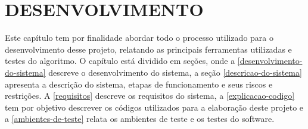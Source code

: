 \chapter{\textbf{DESENVOLVIMENTO}}

Este capítulo tem por finalidade abordar todo o processo utilizado para o desenvolvimento desse projeto, relatando as principais ferramentas utilizadas e testes do algoritmo. O capítulo está dividido em seções, onde a \autoref{desenvolvimento-do-sistema} descreve o desenvolvimento do sistema, a seção \autoref{descricao-do-sistema} apresenta a descrição do sistema, etapas de funcionamento e seus riscos e restrições. A \autoref{requisitos} descreve os requisitos do sistema, a \autoref{explicacao-codigo} tem por objetivo descrever os códigos utilizados para a elaboração deste projeto e a \autoref{ambientes-de-teste} relata os ambientes de teste e os testes do software.















